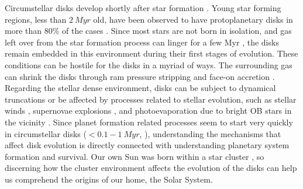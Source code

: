\documentclass[fleqn,usenatbib]{mnras}
\begin{document}
Circumstellar disks develop shortly after star formation \citep{williams2011}. Young star forming regions, less than $\SI{2}{Myr}$ old, have been observed to have protoplanetary disks in more than 80\% of the cases \citep{fedele2010}. Since most stars are not born in isolation, and gas left over from the star formation process can linger for a few Myr \citep{goodwin2009,portegieszwart2010}, the disks remain embedded in this environment during their first stages of evolution. These conditions can be hostile for the disks in a myriad of ways. The surrounding gas can shrink the disks through ram pressure stripping and face-on accretion \citep{wijnen2016, wijnen2017}. Regarding the stellar dense environment, disks can be subject to dynamical truncations \citep{portegieszwart2016, vincke2015, vincke2016} or be affected by processes related to stellar evolution, such as stellar winds \citep{pelupessy2012}, supernovae explosions \citep{close2017}, and photoevaporation due to bright OB stars in the vicinity \citep[e.g.][]{haworth2017, guarcello2016}. Since planet formation related processes seem to start very quickly in circumstellar disks ($< 0.1 - \SI{1}{Myr}$, \citet{manara2018,najita2014}), understanding the mechanisms that affect disk evolution is directly connected with understanding planetary system formation and survival. Our own Sun was born within a star cluster \citep{adams2010,portegieszwart2009}, so discerning how the cluster environment affects the evolution of the disks can help us comprehend the origins of our home, the Solar System. 
\end{document}
